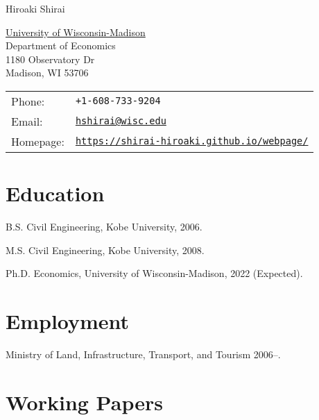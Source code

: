 \documentclass[letterpaper]{article}
\def\name{Hiroaki Shirai}
\renewenvironment{itemize}{
  \begin{list}{}{
    \setlength{\leftmargin}{1.5em}
  }
}{
  \end{list}
}
\begin{document}
{\huge \name}


\vspace{0.25in}

\begin{minipage}{0.45\linewidth}
  \href{http://www.unc.edu/}{University of Wisconsin-Madison} \\
  Department of Economics \\
  1180 Observatory Dr \\
  Madison, WI 53706
\end{minipage}
\begin{minipage}{0.45\linewidth}
  \begin{tabular}{ll}
    Phone: & {\tt +1-608-733-9204} \\
    Email: & \href{mailto:hshirai@wisc.edu}{\tt hshirai@wisc.edu} \\
    Homepage: & \href{https://shirai-hiroaki.github.io/webpage/}{\tt https://shirai-hiroaki.github.io/webpage/} \\
  \end{tabular}
\end{minipage}

\section*{Education}

\begin{itemize}
  \item B.S. Civil Engineering, Kobe University, 2006.
  \item M.S. Civil Engineering, Kobe University, 2008.
  \item Ph.D. Economics, University of Wisconsin-Madison, 2022 (Expected).
\end{itemize}


\section*{Employment}

\begin{itemize}
\item Ministry of Land, Infrastructure, Transport, and Tourism 2006--.
\end{itemize}


\section*{Working Papers}
\end{document}
